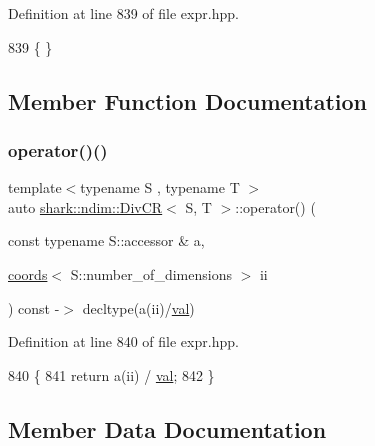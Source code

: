 Definition at line 839 of file expr.\+hpp.


\begin{DoxyCode}
839 \{ \}
\end{DoxyCode}


\subsection{Member Function Documentation}
\hypertarget{classshark_1_1ndim_1_1_div_c_r_af8f393a47d5d06cf1df122ab84741852}{}\label{classshark_1_1ndim_1_1_div_c_r_af8f393a47d5d06cf1df122ab84741852} 
\subsubsection{\texorpdfstring{operator()()}{operator()()}}
{\footnotesize\ttfamily template$<$typename S , typename T $>$ \\
auto \hyperlink{classshark_1_1ndim_1_1_div_c_r}{shark\+::ndim\+::\+Div\+CR}$<$ S, T $>$\+::operator() (\begin{DoxyParamCaption}\item[{const typename S\+::accessor \&}]{a,  }\item[{\hyperlink{structshark_1_1ndim_1_1coords}{coords}$<$ S\+::number\+\_\+of\+\_\+dimensions $>$}]{ii }\end{DoxyParamCaption}) const -\/$>$ decltype(a(ii)/\hyperlink{classshark_1_1ndim_1_1_div_c_r_ac37f8f30a7315b8f98e3d29bf59f2529}{val}) \hspace{0.3cm}{\ttfamily [inline]}}



Definition at line 840 of file expr.\+hpp.


\begin{DoxyCode}
840                                                                                                            
                   \{
841                 \textcolor{keywordflow}{return} a(ii) / \hyperlink{classshark_1_1ndim_1_1_div_c_r_ac37f8f30a7315b8f98e3d29bf59f2529}{val};
842             \}
\end{DoxyCode}


\subsection{Member Data Documentation}
\hypertarget{classshark_1_1ndim_1_1_div_c_r_ac37f8f30a7315b8f98e3d29bf59f2529}{}\label{classshark_1_1ndim_1_1_div_c_r_ac37f8f30a7315b8f98e3d29bf59f2529} 
